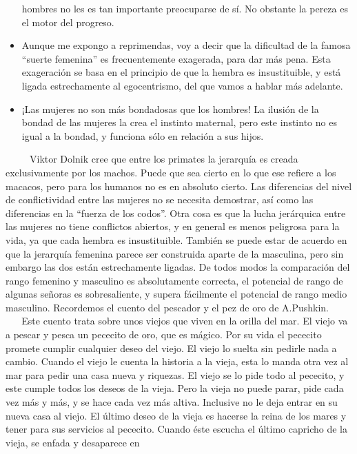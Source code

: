 \begin{itemize}
  hombres no les es tan importante preocuparse de sí. No obstante la
  pereza es el motor del progreso.
\item
  Aunque me expongo a reprimendas, voy a decir que la dificultad de la
  famosa ``suerte femenina'' es frecuentemente exagerada, para dar más
  pena. Esta exageración se basa en el principio de que la hembra es
  insustituible, y está ligada estrechamente al egocentrismo, del que
  vamos a hablar más adelante.
\item
  ¡Las mujeres no son más bondadosas que los hombres! La ilusión de la
  bondad de las mujeres la crea el instinto maternal, pero este instinto
  no es igual a la bondad, y funciona sólo en relación a sus hijos.
\end{itemize}

~ ~ ~ Viktor Dolnik cree que entre los primates la jerarquía es creada
exclusivamente por los machos. Puede que sea cierto en lo que ese
refiere a los macacos, pero para los humanos no es en absoluto cierto.
Las diferencias del nivel de conflictividad entre las mujeres no se
necesita demostrar, así como las diferencias en la ``fuerza de los
codos''. Otra cosa es que la lucha jerárquica entre las mujeres no tiene
conflictos abiertos, y en general es menos peligrosa para la vida, ya
que cada hembra es insustituible. También se puede estar de acuerdo en
que la jerarquía femenina parece ser construida aparte de la masculina,
pero sin embargo las dos están estrechamente ligadas. De todos modos la
comparación del rango femenino y masculino es absolutamente correcta, el
potencial de rango de algunas señoras es sobresaliente, y supera
fácilmente el potencial de rango medio masculino. Recordemos el cuento
del pescador y el pez de oro de A.Pushkin.\\
\hspace*{0.333em} ~ ~ Este cuento trata sobre unos viejos que viven en
la orilla del mar. El viejo va a pescar y pesca un pececito de oro, que
es mágico. Por su vida el pececito promete cumplir cualquier deseo del
viejo. El viejo lo suelta sin pedirle nada a cambio. Cuando el viejo le
cuenta la historia a la vieja, esta lo manda otra vez al mar para pedir
una casa nueva y riquezas. El viejo se lo pide todo al pececito, y este
cumple todos los deseos de la vieja. Pero la vieja no puede parar, pide
cada vez más y más, y se hace cada vez más altiva. Inclusive no le deja
entrar en su nueva casa al viejo. El último deseo de la vieja es hacerse
la reina de los mares y tener para sus servicios al pececito. Cuando
éste escucha el último capricho de la vieja, se enfada y desaparece en
